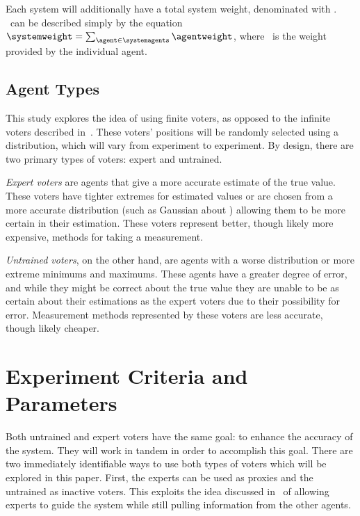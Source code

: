 Each system will additionally have a total system weight, denominated with
\systemweight.
\systemweight\ can be described simply by the equation
$\systemweight = \sum_{\agent \in \systemagents} \agentweight$, where \agentweight\
is the weight provided by the individual agent.


\subsection{Agent Types}\label{subsec:agent-types}
This study explores the idea of using finite voters, as opposed to the
infinite voters described in~\cite{Cohensius2017}.
These voters' positions will be randomly selected using a distribution, which
will vary from experiment to experiment.
By design, there are two primary types of voters: expert and untrained.

\textit{Expert voters} are agents that give a more accurate estimate of the
true value.
These voters have tighter extremes for estimated values or are chosen from
a more accurate distribution (such as Gaussian about \truth) allowing
them to be more certain in their estimation.
These voters represent better, though likely more expensive, methods for
taking a measurement.

\textit{Untrained voters}, on the other hand, are agents with a worse
distribution or more extreme minimums and maximums.
These agents have a greater degree of error, and while they might be correct
about the true value they are unable to be as certain about their estimations
as the expert voters due to their possibility for error.
Measurement methods represented by these voters are less accurate, though
likely cheaper.



\section{Experiment Criteria and Parameters}\label{sec:experiment-criteria
-and-parameters}
Both untrained and expert voters have the same goal: to enhance the accuracy of
the system.
They will work in tandem in order to accomplish this goal.
There are two immediately identifiable ways to use both types of voters which
will be explored in this paper.
First, the experts can be used as proxies and the untrained as inactive voters.
This exploits the idea discussed in~\cite{Miller1969, Mueller1972} of
allowing experts to guide the system while still pulling information from the
other agents.

